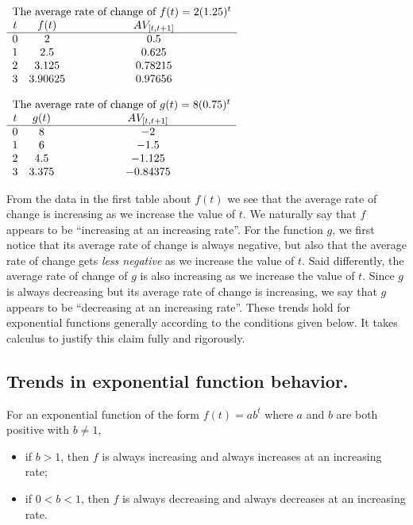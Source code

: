 \documentclass[nooutcomes]{ximera}
\begin{document}
\begin{center}
$
{\begin{array}{ccc}
\multicolumn{3}{c}{\text{The average rate of change of } f(t) = 2(1.25)^t}\\
t&f(t)&AV_{[t,t+1]}\\
\hline
0&2&0.5\\
1&2.5&0.625\\
2&3.125&0.78215\\
3&3.90625&0.97656
\end{array}}%
$
\end{center}
\begin{center}
$
{\begin{array}{ccc}
\multicolumn{3}{c}{\text{The average rate of change of } g(t) = 8(0.75)^t}\\
t&g(t)&AV_{[t,t+1]}\\
\hline
0&8&-2\\
1&6&-1.5\\
2&4.5&-1.125\\
3&3.375&-0.84375
\end{array}}%
$
\end{center}

From the data in the first table about $f(t)$ we see that the average rate of change is increasing as we increase the value of $t$.  We naturally say that $f$ appears to be ``increasing at an increasing rate''.  For the function $g$, we first notice that its average rate of change is always negative, but also that the average rate of change gets \emph{less negative} as we increase the value of $t$. Said differently, the average rate of change of $g$ is also increasing as we increase the value of $t$.  Since $g$ is always decreasing but its average rate of change is increasing, we say that $g$ appears to be ``decreasing at an increasing rate''.  These trends hold for exponential functions generally according to the conditions given below.  It takes calculus to justify this claim fully and rigorously. 

\begin{callout}
\section{Trends in exponential function behavior.}
For an exponential function of the form $f(t) = ab^t$ where $a$ and $b$ are both positive with $b \ne 1$,\leavevmode%
\begin{itemize}[label=\textbullet]
\item{}\hypertarget{p-1228}{}%
if $b \gt 1$, then $f$ is always increasing and always increases at an increasing rate;%
\item{}\hypertarget{p-1229}{}%
if $0 \lt b \lt 1$, then $f$ is always decreasing and always decreases at an increasing rate.%
\end{itemize}
\end{callout}
\end{document}
